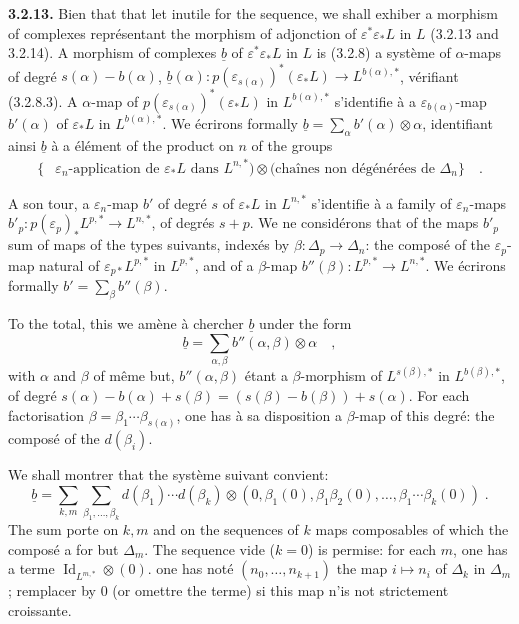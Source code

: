 \documentclass[12pt,a4paper]{article}
\theoremstyle{plain}
\theoremstyle{definition}
\DeclareMathOperator{\Id}{Id}
\begin{document}
\noindent\textbf{3.2.13.} Bien that that let inutile for the sequence, we shall exhiber a morphism of complexes repr\'{e}sentant the morphism of adjonction of $\varepsilon^{*}\varepsilon_{*}L$ in $L$ (3.2.13 and 3.2.14). A morphism of complexes $\underline{b}$ of $\varepsilon^{*}\varepsilon_{*}L$ in $L$ is (3.2.8) a syst\`{e}me of $\alpha$-maps of degr\'{e} $s(\alpha)-b(\alpha)$, $\underline{b}(\alpha): p(\varepsilon_{s(\alpha)})^{*}(\varepsilon_{*}L) \longrightarrow L^{b(\alpha),*}$, v\'{e}rifiant (3.2.8.3). A $\alpha$-map of $p(\varepsilon_{s(\alpha)})^{*}(\varepsilon_{*}L)$ in $L^{b(\alpha),*}$ s'identifie \`{a} a $\varepsilon_{b(\alpha)}$-map $b'(\alpha)$ of $\varepsilon_{*}L$ in $L^{b(\alpha),*}$. We \'{e}crirons formally $\underline{b} = \sum_{\alpha} b'(\alpha) \otimes \alpha$, identifiant ainsi $\underline{b}$ \`{a} a \'{e}l\'{e}ment of the product on $n$ of the groups
\begin{align*}
\{&\varepsilon_{n}\text{-application de }\varepsilon_{*}L\text{ dans }L^{n,*}) \otimes (\text{cha\^{i}nes non d\'{e}g\'{e}n\'{e}r\'{e}es de }\Delta_{n}\}\quad.
\end{align*}

A son tour, a $\varepsilon_{n}$-map $b'$ of degr\'{e} $s$ of $\varepsilon_{*}L$ in $L^{n,*}$ s'identifie \`{a} a family of $\varepsilon_{n}$-maps $b'_{p}: p(\varepsilon_{p})_{*}L^{p,*} \longrightarrow L^{n,*}$, of degr\'{e}s $s+p$. We ne consid\'{e}rons that of the maps $b'_{p}$ sum of maps of the types suivants, index\'{e}s by $\beta: \Delta_{p} \to \Delta_{n}$: the compos\'{e} of the $\varepsilon_{p}$-map natural of $\varepsilon_{p*}L^{p,*}$ in $L^{p,*}$, and of a $\beta$-map $b''(\beta): L^{p,*} \longrightarrow L^{n,*}$. We \'{e}crirons formally $b' = \sum_{\beta} b''(\beta)$.

To the total, this we am\`{e}ne \`{a} chercher $\underline{b}$ under the form
\[
\underline{b} = \sum_{\alpha,\beta} b''(\alpha,\beta) \otimes \alpha\quad,
\]
with $\alpha$ and $\beta$ of m\^{e}me but, $b''(\alpha,\beta)$ \'{e}tant a $\beta$-morphism of $L^{s(\beta),*}$ in $L^{b(\beta),*}$, of degr\'{e} $s(\alpha)-b(\alpha)+s(\beta) = (s(\beta)-b(\beta)) + s(\alpha)$. For each factorisation $\beta = \beta_{1} \cdots \beta_{s(\alpha)}$, one has \`{a} sa disposition a $\beta$-map of this degr\'{e}: the compos\'{e} of the $d(\beta_{i})$.

We shall montrer that the syst\`{e}me suivant convient:
\begin{equation}\label{eq:3.2.13.1}
\underline{b} = \sum_{k,m} \sum_{\beta_{1},\ldots,\beta_{k}} d(\beta_{1}) \cdots d(\beta_{k}) \otimes (0, \beta_{1}(0), \beta_{1}\beta_{2}(0), \ldots, \beta_{1}\cdots\beta_{k}(0))\;.
\end{equation}
The sum porte on $k,m$ and on the sequences of $k$ maps composables of which the compos\'{e} a for but $\Delta_{m}$. The sequence vide ($k=0$) is permise: for each $m$, one has a terme $\Id_{L^{m,*}} \otimes (0)$. one has not\'{e} $(n_{0},\ldots,n_{k+1})$ the map $i \mapsto n_{i}$ of $\Delta_{k}$ in $\Delta_{m}$; remplacer by $0$ (or omettre the terme) si this map n'is not strictement croissante.
\end{document}
